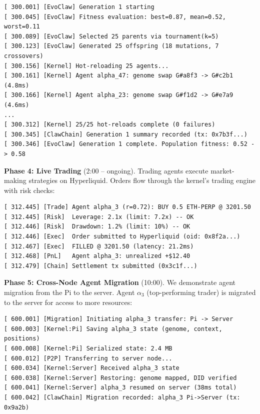 \documentclass{article}
\begin{document}
\begin{lstlisting}[style=rustcode, caption={Evolution cycle log output.}]
[ 300.001] [EvoClaw] Generation 1 starting
[ 300.045] [EvoClaw] Fitness evaluation: best=0.87, mean=0.52, worst=0.11
[ 300.089] [EvoClaw] Selected 25 parents via tournament(k=5)
[ 300.123] [EvoClaw] Generated 25 offspring (18 mutations, 7 crossovers)
[ 300.156] [Kernel] Hot-reloading 25 agents...
[ 300.161] [Kernel] Agent alpha_47: genome swap G#a8f3 -> G#c2b1 (4.8ms)
[ 300.166] [Kernel] Agent alpha_23: genome swap G#f1d2 -> G#e7a9 (4.6ms)
...
[ 300.312] [Kernel] 25/25 hot-reloads complete (0 failures)
[ 300.345] [ClawChain] Generation 1 summary recorded (tx: 0x7b3f...)
[ 300.346] [EvoClaw] Generation 1 complete. Population fitness: 0.52 -> 0.58
\end{lstlisting}

\textbf{Phase 4: Live Trading} (2:00 -- ongoing).
Trading agents execute market-making strategies on Hyperliquid. Orders flow through the kernel's trading engine with risk checks:

\begin{lstlisting}[style=rustcode, caption={Trading execution log.}]
[ 312.445] [Trade] Agent alpha_3 (r=0.72): BUY 0.5 ETH-PERP @ 3201.50
[ 312.445] [Risk]  Leverage: 2.1x (limit: 7.2x) -- OK
[ 312.446] [Risk]  Drawdown: 1.2% (limit: 10%) -- OK
[ 312.446] [Exec]  Order submitted to Hyperliquid (oid: 0x8f2a...)
[ 312.467] [Exec]  FILLED @ 3201.50 (latency: 21.2ms)
[ 312.468] [PnL]   Agent alpha_3: unrealized +$12.40
[ 312.479] [Chain] Settlement tx submitted (0x3c1f...)
\end{lstlisting}

\textbf{Phase 5: Cross-Node Agent Migration} (10:00).
We demonstrate agent migration from the Pi to the server. Agent $\alpha_3$ (top-performing trader) is migrated to the server for access to more resources:

\begin{lstlisting}[style=rustcode, caption={Agent migration log.}]
[ 600.001] [Migration] Initiating alpha_3 transfer: Pi -> Server
[ 600.003] [Kernel:Pi] Saving alpha_3 state (genome, context, positions)
[ 600.008] [Kernel:Pi] Serialized state: 2.4 MB
[ 600.012] [P2P] Transferring to server node...
[ 600.034] [Kernel:Server] Received alpha_3 state
[ 600.038] [Kernel:Server] Restoring: genome mapped, DID verified
[ 600.041] [Kernel:Server] alpha_3 resumed on server (38ms total)
[ 600.042] [ClawChain] Migration recorded: alpha_3 Pi->Server (tx: 0x9a2b)
\end{lstlisting}
\end{document}
